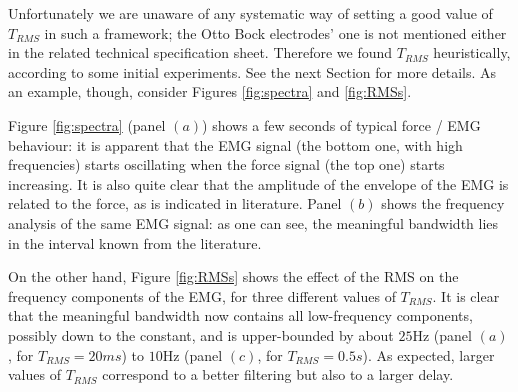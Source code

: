 \documentclass[10pt]{bmc_article}
\def\texttt{[image: ]}
\newenvironment{bmcformat}{\begin{raggedright}\baselineskip20pt\sloppy\setboolean{publ}{false}}{\end{raggedright}\baselineskip20pt\sloppy}
\begin{document}
\begin{bmcformat}


Unfortunately we are unaware of any systematic way of setting a good
value of $T_{RMS}$ in such a framework; the Otto Bock electrodes' one
is not mentioned either in the related technical specification
sheet. Therefore we found $T_{RMS}$ heuristically, according to some
initial experiments. See the next Section for more details. As an
example, though, consider Figures \ref{fig:spectra} and
\ref{fig:RMSs}.

Figure \ref{fig:spectra} (panel $(a)$) shows a few seconds of typical
force / EMG behaviour: it is apparent that the EMG signal (the bottom
one, with high frequencies) starts oscillating when the force signal
(the top one) starts increasing. It is also quite clear that the
amplitude of the envelope of the EMG is related to the force, as is
indicated in literature. Panel $(b)$ shows the frequency analysis of
the same EMG signal: as one can see, the meaningful bandwidth lies in
the interval known from the literature.

On the other hand, Figure \ref{fig:RMSs} shows the effect of the RMS
on the frequency components of the EMG, for three different values of
$T_{RMS}$. It is clear that the meaningful bandwidth now contains all
low-frequency components, possibly down to the constant, and is
upper-bounded by about $25$Hz (panel $(a)$, for $T_{RMS}=20ms$) to
$10$Hz (panel $(c)$, for $T_{RMS}=0.5s$). As expected, larger values
of $T_{RMS}$ correspond to a better filtering but also to a larger
delay.


\end{bmcformat}
\end{document}
